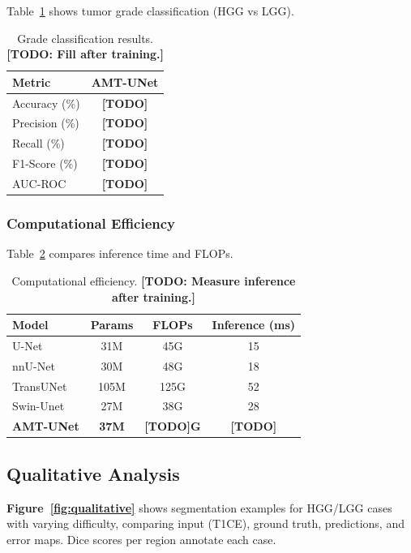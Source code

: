 Table~\ref{tab:classification} shows tumor grade classification (HGG vs LGG).

\begin{table}[t]
\centering
\caption{Grade classification results. \textbf{[TODO: Fill after training.]}}
\label{tab:classification}
\begin{tabular}{lc}
\toprule
Metric & AMT-UNet \\
\midrule
Accuracy (\%) & \textbf{[TODO]} \\
Precision (\%) & \textbf{[TODO]} \\
Recall (\%) & \textbf{[TODO]} \\
F1-Score (\%) & \textbf{[TODO]} \\
AUC-ROC & \textbf{[TODO]} \\
\bottomrule
\end{tabular}
\end{table}

\subsubsection{Computational Efficiency}

Table~\ref{tab:efficiency} compares inference time and FLOPs.

\begin{table}[t]
\centering
\caption{Computational efficiency. \textbf{[TODO: Measure inference after training.]}}
\label{tab:efficiency}
\begin{tabular}{lccc}
\toprule
Model & Params & FLOPs & Inference (ms) \\
\midrule
U-Net & 31M & 45G & 15 \\
nnU-Net & 30M & 48G & 18 \\
TransUNet & 105M & 125G & 52 \\
Swin-Unet & 27M & 38G & 28 \\
\midrule
\textbf{AMT-UNet} & \textbf{37M} & \textbf{[TODO]G} & \textbf{[TODO]} \\
\bottomrule
\end{tabular}
\end{table}

\subsection{Qualitative Analysis}

\textbf{Figure~\ref{fig:qualitative}} shows segmentation examples for HGG/LGG cases with varying difficulty, comparing input (T1CE), ground truth, predictions, and error maps. Dice scores per region annotate each case.

